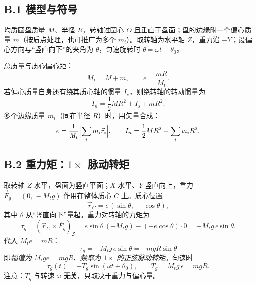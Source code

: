 \documentclass[11pt,a4paper]{article}
\theoremstyle{remark}\newtheorem{remark}{注}
\begin{document}

\subsection*{B.1 模型与符号}

均质圆盘质量 $M$、半径 $R$，转轴过圆心 $O$ 且垂直于盘面；盘的边缘附一个偏心质量 $m$（按质点处理，也可推广为多个 $m_i$）。取转轴为水平轴 $Z$，重力沿 $-Y$；设偏心方向与“竖直向下”的夹角为 $\theta$，匀速旋转时 $\theta=\omega t+\theta_0$。

总质量与质心偏心距：
\begin{equation}
M_t=M+m,\qquad
e=\frac{mR}{M_t}.
\label{eq:unb-e}
\end{equation}
若偏心质量自身还有绕其质心轴的惯量 $I_s$，则绕转轴的转动惯量为
\begin{equation}
I_n=\frac12MR^2+I_s+mR^2 .
\label{eq:unb-In}
\end{equation}
多个边缘质量 $m_i$（同在半径 $R$）时，用矢量合成：
\begin{equation}
e=\frac{1}{M_t}\Bigl|\sum_i m_i\vec r_i\Bigr|,\qquad
I_n=\frac12MR^2+\sum_i m_iR^2 .
\end{equation}

\subsection*{B.2 重力矩：$1\times$ 脉动转矩}

取转轴 $Z$ 水平，盘面为竖直平面；$X$ 水平、$Y$ 竖直向上，重力 $\vec F_g=(0,\,-M_t g)$ 作用在整体质心 $C$ 上。质心位置
\begin{equation}
\vec r_C=e\,(\sin\theta,\,-\cos\theta),
\end{equation}
其中 $\theta$ 从“竖直向下”量起。重力对转轴的力矩为
\begin{equation}
\tau_g=(\vec r_C\times\vec F_g)_Z
=e\sin\theta\,(-M_t g)-(-e\cos\theta)\cdot 0
=-M_t g\,e\sin\theta .
\label{eq:unb-taug}
\end{equation}
代入 $M_te=mR$：
\begin{equation}
\boxed{\;\tau_g=-M_t g\,e\sin\theta=-m g R\sin\theta\;}
\label{eq:unb-taug2}
\end{equation}
即\emph{幅值为 $M_tge=m gR$、频率为 $1\times$ 的正弦脉动转矩}。匀速时
\begin{equation}
\tau_g(t)=-T_g\sin(\omega t+\theta_0),\qquad T_g=M_t g\,e=m g R .
\label{eq:unb-Tg}
\end{equation}
注意：$T_g$ 与转速 $\omega$ \textbf{无关}，只取决于重力与偏心量。
\end{document}
